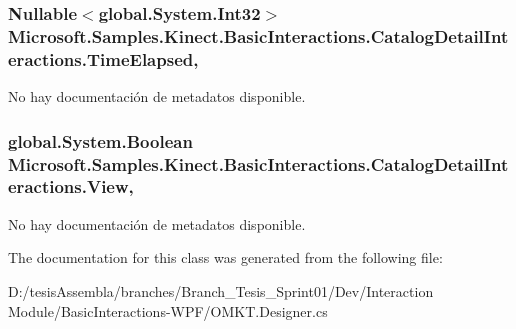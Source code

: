 \hypertarget{class_microsoft_1_1_samples_1_1_kinect_1_1_basic_interactions_1_1_catalog_detail_interactions_ac8bff2e768ddb7e6e03005143683f398}{
\subsubsection[{Time\-Elapsed}]{\setlength{\rightskip}{0pt plus 5cm}Nullable$<$global.\-System.\-Int32$>$ Microsoft.\-Samples.\-Kinect.\-Basic\-Interactions.\-Catalog\-Detail\-Interactions.\-Time\-Elapsed\hspace{0.3cm}{\ttfamily [get]}, {\ttfamily [set]}}}\label{class_microsoft_1_1_samples_1_1_kinect_1_1_basic_interactions_1_1_catalog_detail_interactions_ac8bff2e768ddb7e6e03005143683f398}


No hay documentación de metadatos disponible. 

\hypertarget{class_microsoft_1_1_samples_1_1_kinect_1_1_basic_interactions_1_1_catalog_detail_interactions_a2a2d28c8fa20fa0656ac1dac052397da}{
\subsubsection[{View}]{\setlength{\rightskip}{0pt plus 5cm}global.\-System.\-Boolean Microsoft.\-Samples.\-Kinect.\-Basic\-Interactions.\-Catalog\-Detail\-Interactions.\-View\hspace{0.3cm}{\ttfamily [get]}, {\ttfamily [set]}}}\label{class_microsoft_1_1_samples_1_1_kinect_1_1_basic_interactions_1_1_catalog_detail_interactions_a2a2d28c8fa20fa0656ac1dac052397da}


No hay documentación de metadatos disponible. 



The documentation for this class was generated from the following file\-:\begin{DoxyCompactItemize}
\item 
D\-:/tesis\-Assembla/branches/\-Branch\-\_\-\-Tesis\-\_\-\-Sprint01/\-Dev/\-Interaction Module/\-Basic\-Interactions-\/\-W\-P\-F/O\-M\-K\-T.\-Designer.\-cs\end{DoxyCompactItemize}
